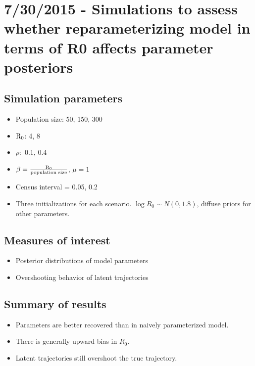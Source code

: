 \section*{7/30/2015 - Simulations to assess whether reparameterizing model in terms of R0 affects parameter posteriors}
\subsection*{Simulation parameters}
\begin{itemize}
	\item Population size: 50, 150, 300
	\item $ \mathrm{R}_0 $: 4, 8
	\item $ \rho: $ 0.1, 0.4
	\item $ \beta =\frac{\mathrm{R}_0}{\text{population size}} $, $ \mu = 1 $
	\item Census interval = 0.05, 0.2
	\item Three initializations for each scenario. $ \log R_0 \sim N(0, 1.8)$, diffuse priors for other parameters.  
\end{itemize}
\subsection*{Measures of interest}
\begin{itemize}
	\item Posterior distributions of model parameters
	\item Overshooting behavior of latent trajectories
\end{itemize}
\subsection*{Summary of results}
\begin{itemize}
	\item Parameters are better recovered than in naively parameterized model. 
	\item There is generally upward bias in $ R_0 $. 
	\item Latent trajectories still overshoot the true trajectory. 
\end{itemize}
